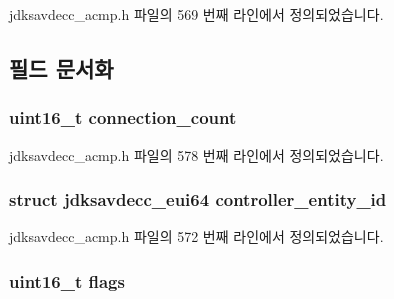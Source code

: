 jdksavdecc\+\_\+acmp.\+h 파일의 569 번째 라인에서 정의되었습니다.



\subsection{필드 문서화}
\subsubsection[{\texorpdfstring{connection\+\_\+count}{connection_count}}]{\setlength{\rightskip}{0pt plus 5cm}uint16\+\_\+t connection\+\_\+count}\hypertarget{structjdksavdecc__acmpdu_add60d6d8d5c6d6819002418e6e8404fa}{}\label{structjdksavdecc__acmpdu_add60d6d8d5c6d6819002418e6e8404fa}


jdksavdecc\+\_\+acmp.\+h 파일의 578 번째 라인에서 정의되었습니다.

\subsubsection[{\texorpdfstring{controller\+\_\+entity\+\_\+id}{controller_entity_id}}]{\setlength{\rightskip}{0pt plus 5cm}struct {\bf jdksavdecc\+\_\+eui64} controller\+\_\+entity\+\_\+id}\hypertarget{structjdksavdecc__acmpdu_affc928ddb4fc62d1d04a775d36e5f2c8}{}\label{structjdksavdecc__acmpdu_affc928ddb4fc62d1d04a775d36e5f2c8}


jdksavdecc\+\_\+acmp.\+h 파일의 572 번째 라인에서 정의되었습니다.

\subsubsection[{\texorpdfstring{flags}{flags}}]{\setlength{\rightskip}{0pt plus 5cm}uint16\+\_\+t flags}\hypertarget{structjdksavdecc__acmpdu_a1e87af3c18a2fd36c61faf89949bdc3f}{}\label{structjdksavdecc__acmpdu_a1e87af3c18a2fd36c61faf89949bdc3f}


